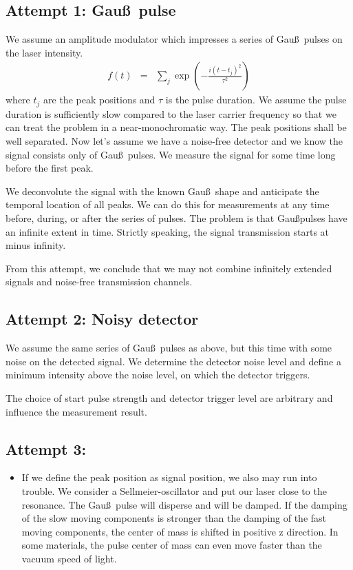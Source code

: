 \documentclass[12pt,a4paper,twoside,openright,BCOR10mm,headsepline,titlepage,abstracton,chapterprefix,final]{scrreprt}
\begin{document}
\subsection{Attempt 1: Gau\ss\, pulse}
We assume an amplitude modulator which impresses a series of Gau\ss\, pulses on the laser intensity.
\begin{eqnarray}
  f(t) &=& \sum_j \exp\left(- \frac{i(t-t_j)^2}{\tau^2}\right) 
\end{eqnarray}
where $t_j$ are the peak positions and $\tau$ is the pulse duration.
We assume the pulse duration is sufficiently slow compared to the laser carrier frequency 
so that we can treat the problem in a near-monochromatic way.
The peak positions shall be well separated.
Now let's assume we have a noise-free detector and we know the signal consists only of Gau\ss\, pulses.
We measure the signal for some time long before the first peak.

We deconvolute the signal with the known Gau\ss\, shape and anticipate the temporal location of all peaks.
We can do this for measurements at any time before, during, or after the series of pulses.
The problem is that Gau\ss pulses have an infinite extent in time.
Strictly speaking, the signal transmission starts at minus infinity.

From this attempt, we conclude that we may not combine infinitely extended signals and noise-free transmission channels.

\subsection{Attempt 2: Noisy detector}
We assume the same series of Gau\ss\, pulses as above, but this time with some noise on the detected signal.
We determine the detector noise level and define a minimum intensity above the noise level, on which the detector triggers.

The choice of start pulse strength and detector trigger level are arbitrary and influence the measurement result.

\subsection{Attempt 3:}

\begin{itemize}
 \item If we define the peak position as signal position, we also may run into trouble.
       We consider a Sellmeier-oscillator and put our laser close to the resonance.
       The Gau\ss\, pulse will disperse and will be damped.
       If the damping of the slow moving components is stronger than the damping of the fast moving components,
       the center of mass is shifted in positive z direction.
       In some materials, the pulse center of mass can even move faster than the vacuum speed of light.
\end{itemize}
\end{document}
